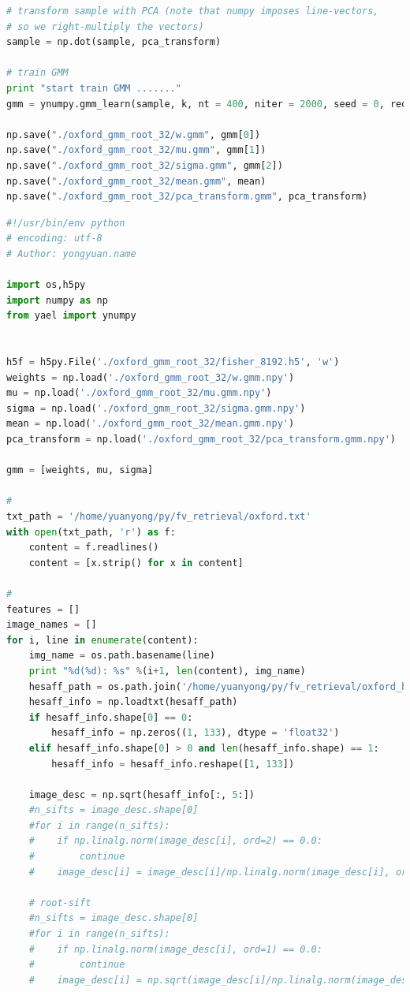 \documentclass[color=cyan,mathpazo,titlestyle=hang]{elegantbook}
\begin{document}
\begin{lstlisting}[language=python]
# transform sample with PCA (note that numpy imposes line-vectors,
# so we right-multiply the vectors)
sample = np.dot(sample, pca_transform)

# train GMM
print "start train GMM ......."
gmm = ynumpy.gmm_learn(sample, k, nt = 400, niter = 2000, seed = 0, redo = 1, use_weights = True)

np.save("./oxford_gmm_root_32/w.gmm", gmm[0])
np.save("./oxford_gmm_root_32/mu.gmm", gmm[1])
np.save("./oxford_gmm_root_32/sigma.gmm", gmm[2])
np.save("./oxford_gmm_root_32/mean.gmm", mean)
np.save("./oxford_gmm_root_32/pca_transform.gmm", pca_transform)
\end{lstlisting}

\begin{lstlisting}[language=python]
#!/usr/bin/env python
# encoding: utf-8
# Author: yongyuan.name

import os,h5py
import numpy as np
from yael import ynumpy


h5f = h5py.File('./oxford_gmm_root_32/fisher_8192.h5', 'w')
weights = np.load('./oxford_gmm_root_32/w.gmm.npy')
mu = np.load('./oxford_gmm_root_32/mu.gmm.npy')
sigma = np.load('./oxford_gmm_root_32/sigma.gmm.npy')
mean = np.load('./oxford_gmm_root_32/mean.gmm.npy')
pca_transform = np.load('./oxford_gmm_root_32/pca_transform.gmm.npy')

gmm = [weights, mu, sigma]

# 
txt_path = '/home/yuanyong/py/fv_retrieval/oxford.txt'
with open(txt_path, 'r') as f:
    content = f.readlines()
    content = [x.strip() for x in content]

# 
features = []
image_names = []
for i, line in enumerate(content):
    img_name = os.path.basename(line)
    print "%d(%d): %s" %(i+1, len(content), img_name)
    hesaff_path = os.path.join('/home/yuanyong/py/fv_retrieval/oxford_hesaff_sift', os.path.splitext(os.path.basename(line))[0] + '.hesaff.sift')
    hesaff_info = np.loadtxt(hesaff_path)
    if hesaff_info.shape[0] == 0:
        hesaff_info = np.zeros((1, 133), dtype = 'float32')
    elif hesaff_info.shape[0] > 0 and len(hesaff_info.shape) == 1:
        hesaff_info = hesaff_info.reshape([1, 133])

    image_desc = np.sqrt(hesaff_info[:, 5:])
    #n_sifts = image_desc.shape[0]
    #for i in range(n_sifts):
    #    if np.linalg.norm(image_desc[i], ord=2) == 0.0:
    #        continue
    #    image_desc[i] = image_desc[i]/np.linalg.norm(image_desc[i], ord=2)

    # root-sift
    #n_sifts = image_desc.shape[0]
    #for i in range(n_sifts):
    #    if np.linalg.norm(image_desc[i], ord=1) == 0.0:
    #        continue
    #    image_desc[i] = np.sqrt(image_desc[i]/np.linalg.norm(image_desc[i], ord=1))


\end{lstlisting}
\end{document}

